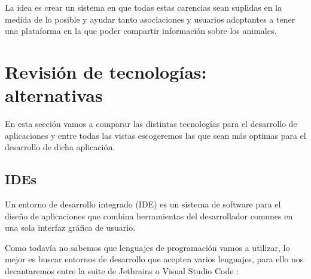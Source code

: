 La idea es crear un sistema en que todas estas carencias sean suplidas en la medida de lo posible y ayudar tanto asociaciones y usuarios adoptantes a tener una plataforma en la que poder compartir información sobre los animales.




\section{Revisión de tecnologías: alternativas} \label{rev}
En esta sección vamos a comparar las distintas tecnologías para el desarrollo de aplicaciones y entre todas las vistas escogeremos las que sean más optimas para el desarrollo de dicha aplicación.

\subsection{IDEs}
Un entorno de desarrollo integrado (IDE) \cite{ide} es un sistema de software para el diseño de aplicaciones que combina herramientas del desarrollador comunes en una sola interfaz gráfica de usuario.

Como todavía no sabemos que lenguajes de programación vamos a utilizar, lo mejor es buscar entornos de desarrollo que acepten varios lenguajes, para ello nos decantaremos entre la suite de Jetbrains \cite{jetbrains} o Visual Studio Code \cite{vscode}:

